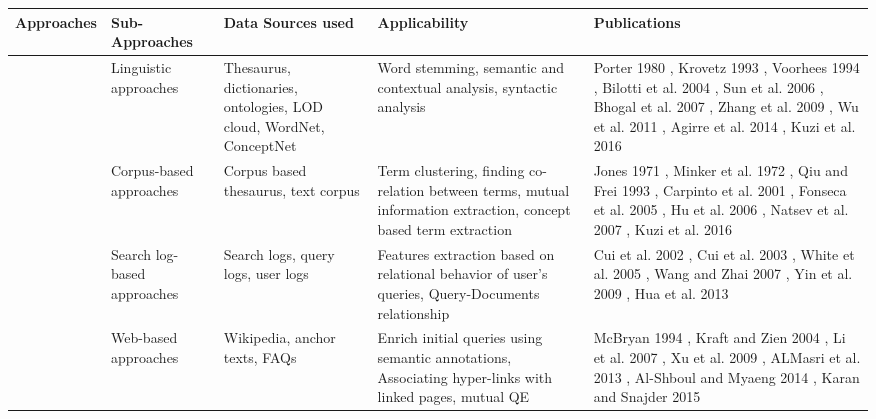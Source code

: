 \begin{table}[!h]
{\begin{tabular}{ | M{1.6cm} | M{2.0cm} | M{2.2cm} |M{2.7cm}| M{3.9cm} | }
			\textbf{Approaches} & \textbf{Sub-Approaches} & \textbf{Data Sources used} & \textbf{Applicability} & \textbf{Publications} \\ \hline 
			 & Linguistic approaches & Thesaurus, dictionaries, ontologies, LOD cloud, WordNet, ConceptNet & Word stemming, semantic and contextual analysis, syntactic analysis  & Porter 1980 \cite{porter1980algorithm}, Krovetz 1993 \cite{krovetz1993viewing}, Voorhees 1994 \cite{voorhees1994query}, Bilotti et al. 2004 \cite{bilotti2004works}, Sun et al. 2006 \cite{sun2006mining}, Bhogal et al. 2007 \cite{bhogal2007review}, Zhang et al. 2009 \cite{zhang2009concept}, Wu et al. 2011 \cite{wu2011study}, Agirre et al. 2014 \cite{agirre2014random}, Kuzi et al. 2016 \cite{kuzi2016query}
			\\  & Corpus-based approaches & Corpus based thesaurus, text corpus & Term clustering, finding co-relation between terms, mutual information extraction, concept based term extraction & Jones 1971 \cite{jones1971automatic}, Minker et al. 1972 \cite{minker1972evaluation}, Qiu and Frei 1993 \cite{qiu1993concept}, Carpinto et al. 2001 \cite{carpineto2001information}, Fonseca et al. 2005 \cite{fonseca2005concept}, Hu et al. 2006 \cite{hu2006improving}, Natsev et al. 2007 \cite{natsev2007semantic}, Kuzi et al. 2016 \cite{kuzi2016query}
			\\  & Search log-based approaches  & Search logs, query logs, user logs  & Features extraction based on relational behavior of user's queries, Query-Documents relationship & Cui et al. 2002 \cite{cui2002probabilistic}, Cui et al. 2003 \cite{cui2003query}, White et al. 2005 \cite{white2005study}, Wang and Zhai 2007 \cite{wang2007learn}, Yin et al. 2009 \cite{yin2009query}, Hua et al. 2013 \cite{hua2013clickage}   \\  &Web-based approaches & Wikipedia, anchor texts, FAQs & Enrich initial queries using semantic annotations, Associating hyper-links with linked pages, mutual QE & McBryan 1994 \cite{mcbryan1994genvl}, Kraft and Zien 2004 \cite{kraft2004mining}, Li et al. 2007 \cite{li2007improving}, Xu et al. 2009 \cite{xu2009query}, ALMasri et al. 2013 \cite{almasri2013wikipedia}, Al-Shboul and Myaeng 2014 \cite{al2014wikipedia}, Karan and Snajder 2015 \cite{karan2015evaluation}  \\ \hline
			

\end{tabular}}
\end{table}
